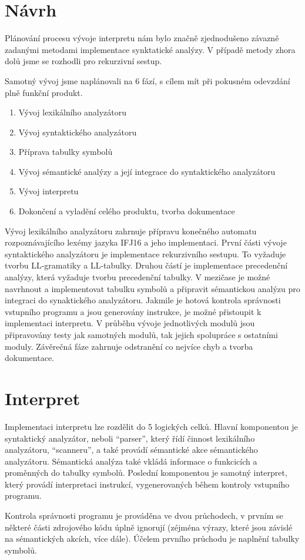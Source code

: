 \documentclass[a4paper, 11pt]{article}
\begin{document}
    \section{Návrh}
    Plánování procesu vývoje interpretu nám bylo značně zjednodušeno závazně zadanými metodami implementace synktatické analýzy. V případě metody zhora dolů jsme se rozhodli pro rekurzivní sestup.\par
    Samotný vývoj jsme naplánovali na 6 fází, s cílem mít při pokusném odevzdání plně funkční produkt.
    \begin{enumerate}[itemsep=0mm]
        \item Vývoj lexikálního analyzátoru
        \item Vývoj syntaktického analyzátoru
        \item Příprava tabulky symbolů
        \item Vývoj sémantické analýzy a její integrace do syntaktického analyzátoru
        \item Vývoj interpretu
        \item Dokončení a vyladění celého produktu, tvorba dokumentace
    \end{enumerate}
    Vývoj lexikálního analyzátoru zahrnuje přípravu konečného automatu rozpoznávajícího lexémy jazyka IFJ16 a jeho implementaci. První části vývoje syntaktického analyzátoru je implementace rekurzivního sestupu. To vyžaduje tvorbu LL-gramatiky a LL-tabulky. Druhou částí je implementace precedenční analýzy, která vyžaduje tvorbu precedenční tabulky. V mezičase je možné navrhnout a implementovat tabulku symbolů a připravit sémantickou analýzu pro integraci do synaktického analyzátoru. Jakmile je hotová kontrola správnosti vstupního programu a jsou generovány instrukce, je možné přistoupit k implementaci interpretu. V průběhu vývoje jednotlivých modulů jsou připravovány testy jak samotných modulů, tak jejich spolupráce s ostatními moduly. Závěrečná fáze zahrnuje odstranění co nejvíce chyb a tvorba dokumentace.
    \section{Interpret}
    Implementaci interpretu lze rozdělit do 5 logických celků. Hlavní komponentou je syntaktický analyzátor, neboli “parser”, který řídí činnost lexikálního analyzátoru, “scanneru”, a také provádí sémantické akce sémantického analyzátoru. Sémantická analýza také vkládá informace o funkcicích a proměnných do tabulky symbolů. Poslední komponentou je samotný interpret, který provádí interpretaci instrukcí, vygenerovaných během kontroly vstupního programu.\par
    Kontrola správnosti programu je prováděna ve dvou průchodech, v prvním se některé části zdrojového kódu úplně ignorují (zéjména výrazy, které jsou závislé na sémantických akcích, více dále). Účelem prvního průchodu je naplnění tabulky symbolů.
\end{document}
